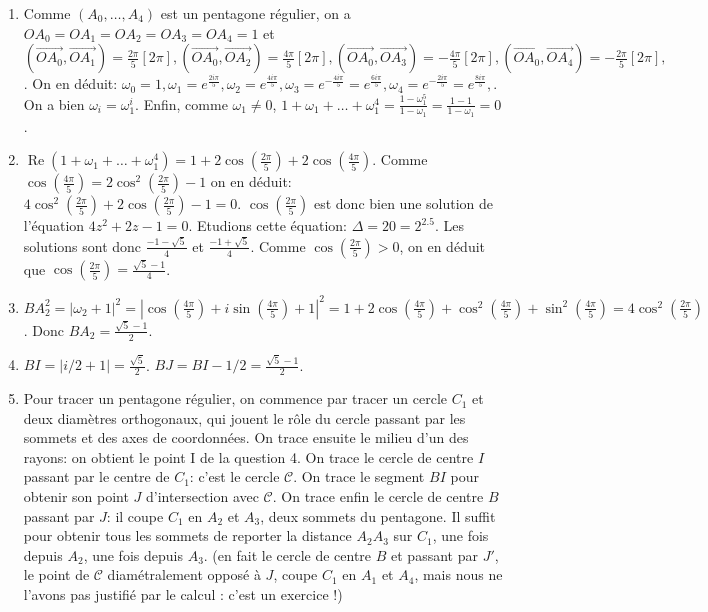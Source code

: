 \documentclass[11pt,a4paper]{article}
\begin{document}
\begin{enumerate}
\item
Comme $(A_{0},\ldots,A_{4})$ est un pentagone r\'egulier, on a
$OA_{0}=OA_{1}=OA_{2}=OA_{3}=OA_{4}=1$ et $
  (\overrightarrow{OA_{0}},\overrightarrow{OA_{1}})=\frac{2\pi}{5}[2\pi],
  (\overrightarrow{OA_{0}},\overrightarrow{OA_{2}})=\frac{4\pi}{5}[2\pi],
  (\overrightarrow{OA_{0}},\overrightarrow{OA_{3}})=-\frac{4\pi}{5}[2\pi],
  (\overrightarrow{OA_{0}},\overrightarrow{OA_{4}})=-\frac{2\pi}{5}[2\pi],
 $.
On en d\'eduit:
 $
  \omega_{0}=1,
  \omega_{1}=e^{\frac{2i\pi}{5}},
  \omega_{2}=e^{\frac{4i\pi}{5}},
  \omega_{3}=e^{-\frac{4i\pi}{5}}=e^{\frac{6i\pi}{5}},
  \omega_{4}=e^{-\frac{2i\pi}{5}}=e^{\frac{8i\pi}{5}},
 $.
On a bien $\omega_{i}=\omega_{1}^i$. Enfin, comme
$\omega_{1}\neq0$, $1+\omega_{1}+\ldots+\omega_{1}^4=
\frac{1-\omega_{1}^5}{1-\omega_{1}}=\frac{1-1}{1-\omega_{1}}=0$.

\item $\mathop{\mathrm{Re}}\nolimits(1+\omega_{1}+\ldots+\omega_{1}^4)=
1+2\cos(\frac{2\pi}{5})+2\cos(\frac{4\pi}{5})$. Comme
$\cos(\frac{4\pi}{5})=2\cos^2(\frac{2\pi}{5})-1$ on en d\'eduit:
$4\cos^2(\frac{2\pi}{5})+2\cos(\frac{2\pi}{5})-1=0$.
$\cos(\frac{2\pi}{5})$ est donc bien une solution de l'\'equation
$4z^2+2z-1=0$. Etudions cette \'equation: $\Delta=20=2^2.5$. Les
solutions sont donc $\frac{-1-\sqrt{5}}{4}$ et
$\frac{-1+\sqrt{5}}{4}$. Comme $\cos(\frac{2\pi}{5})>0$, on en
d\'eduit que $\cos(\frac{2\pi}{5})=\frac{\sqrt{5}-1}{4}$.

\item
 $
  BA_{2}^2=|\omega_{2}+1|^2
          =|\cos(\frac{4\pi}{5})+i\sin(\frac{4\pi}{5})+1|^2
          =1+2\cos(\frac{4\pi}{5})+\cos^2(\frac{4\pi}{5})+\sin^2(\frac{4\pi}{5})
          =4\cos^2(\frac{2\pi}{5})
  $. Donc $BA_{2}=\frac{\sqrt{5}-1}{2}$.

\item
$BI=|i/2+1|=\frac{\sqrt{5}}{2}$. $BJ=BI-1/2=\frac{\sqrt{5}-1}{2}$.

\item
Pour tracer un pentagone r\'egulier, on commence par tracer un
cercle $C_{1}$ et deux diam\`etres orthogonaux, qui jouent le r\^ole
du cercle passant par les sommets et des axes de coordonn\'ees. On
trace ensuite le milieu d'un des rayons: on obtient le point I de
la question 4. On trace le  cercle de centre $I$ passant par le
centre de $C_{1}$: c'est le cercle $\mathcal{C}$. On trace le
segment $BI$ pour obtenir son point $J$ d'intersection avec
$\mathcal{C}$. On trace enfin le cercle de centre $B$ passant par
$J$: il coupe $C_{1}$ en $A_{2}$ et $A_{3}$, deux sommets du
pentagone. Il suffit pour obtenir tous les sommets de reporter la
distance $A_{2}A_{3}$ sur $C_{1}$, une fois depuis $A_{2}$, une
fois depuis $A_{3}$. (en fait le cercle de centre $B$ et passant
par $J'$, le point de $\mathcal{C}$ diam\'etralement oppos\'e \`a
$J$, coupe $C_{1}$ en $A_{1}$ et $A_{4}$, mais nous ne l'avons pas
justifi\'e par le calcul : c'est un exercice !)
\end{enumerate}
\end{document}
